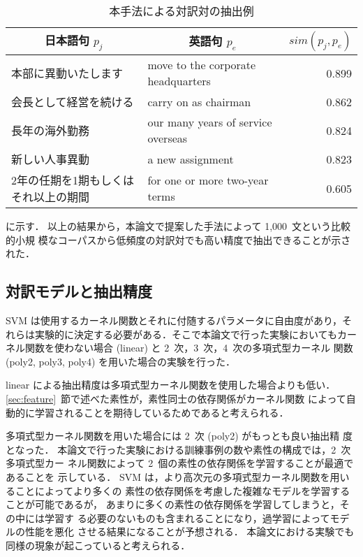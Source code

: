 \begin{table*}[tbp]
  \centering
  \caption{本手法による対訳対の抽出例}
  \label{tab:success}
  {\small
  \begin{tabular}{|l|l|r|} \hline
    \multicolumn{1}{|c|}{日本語句 $p_j$} &
    \multicolumn{1}{c|}{英語句 $p_e$} &
    \multicolumn{1}{c|}{$sim(p_j, p_e)$} \\ \hline

    本部に異動いたします &
    move to the corporate headquarters &
    0.899 \\

    会長として経営を続ける &
    carry on as chairman &
    0.862 \\

    長年の海外勤務 &
    our many years of service overseas &
    0.824 \\

    新しい人事異動 &
    a new assignment &
    0.823 \\

    2年の任期を1期もしくはそれ以上の期間 &
    for one or more two-year terms &
    0.605 \\ \hline
  \end{tabular}}
\end{table*}
に示す．
以上の結果から，本論文で提案した手法によって 1,000~文という比較的小規
模なコーパスから低頻度の対訳対でも高い精度で抽出できることが示された．

\subsection{対訳モデルと抽出精度}
\label{sec:kernel}

SVM は使用するカーネル関数とそれに付随するパラメータに自由度があり，そ
れらは実験的に決定する必要がある．そこで本論文で行った実験においてもカー
ネル関数を使わない場合 (linear) と 2~次，3~次，4~次の多項式型カーネル
関数 (poly2, poly3, poly4) を用いた場合の実験を行った．

linear による抽出精度は多項式型カーネル関数を使用した場合よりも低い．
\ref{sec:feature}~節で述べた素性が，素性同士の依存関係がカーネル関数
によって自動的に学習されることを期待しているためであると考えられる．

多項式型カーネル関数を用いた場合には 2~次 (poly2) がもっとも良い抽出精
度となった．
本論文で行った実験における訓練事例の数や素性の構成では，2~次多項式型カー
ネル関数によって 2~個の素性の依存関係を学習することが最適であることを
示している．
SVM は，より高次元の多項式型カーネル関数を用いることによってより多くの
素性の依存関係を考慮した複雑なモデルを学習することが可能であるが，
あまりに多くの素性の依存関係を学習してしまうと，その中には学習す
る必要のないものも含まれることになり，過学習によってモデルの性能を悪化
させる結果になることが予想される．
本論文における実験でも同様の現象が起こっていると考えられる．

